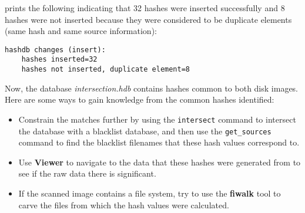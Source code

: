 \hdb prints the following indicating that 32 hashes were inserted successfully and 8 hashes were not inserted because they were considered to be duplicate elements (same hash and same source information):
\begingroup
\footnotesize
\begin{Verbatim}[fontfamily=courier]
hashdb changes (insert):
    hashes inserted=32
    hashes not inserted, duplicate element=8
\end{Verbatim}
\endgroup

Now, the database \textit{intersection.hdb} contains hashes common to both disk images. \\

Here are some ways to gain knowledge from the common hashes identified:
\begin{itemize}
\item Constrain the matches further by using the \texttt{intersect} command
to intersect the database with a blacklist database,
and then use the \texttt{get\_sources} command
to find the blacklist filenames that these hash values correspond to.
\item Use \bulk \textbf{Viewer} to navigate to the data that these hashes were generated from
to see if the raw data there is significant.
\item If the scanned image contains a file system,
try to use the \textbf{fiwalk} tool to carve the files from which the hash values
were calculated.
\end{itemize}
